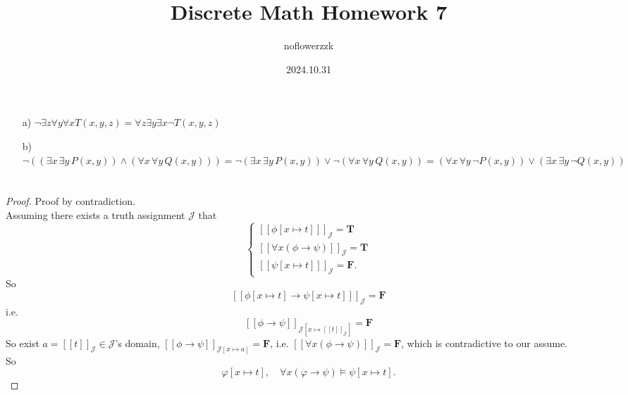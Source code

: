 \documentclass{article}
\title{Discrete Math Homework 7}
\author{noflowerzzk}
\date{2024.10.31}
\begin{document}
\maketitle

\section{}
\begin{itemize}
    \item [a)] $ \lnot \exists z \forall y \forall x T(x, y, z) = \forall z \exists y \exists x \lnot T(x, y , z)$
    \item [b)] $\neg \left( (\exists x \, \exists y \, P(x, y)) \land (\forall x \, \forall y \, Q(x, y)) \right)
     = \neg (\exists x \, \exists y \, P(x, y)) \lor \neg (\forall x \, \forall y \, Q(x, y))
     = (\forall x \, \forall y \, \neg P(x, y)) \lor (\exists x \, \exists y \, \neg Q(x, y))$
\end{itemize}

\section{}

\begin{proof}
    Proof by contradiction. \\
    Assuming there exists a truth assignment $\mathcal{J}$ that 
    $$
    \begin{cases}
        [\![\phi [x \mapsto t]]\!]_\mathcal{J} = \mathbf{T} \\
        [\![\forall x (\phi \rightarrow \psi )]\!]_\mathcal{J} = \mathbf{T} \\
        [\![\psi[x \mapsto t]]\!]_\mathcal{J} = \mathbf{F}.
    \end{cases}
    $$
    So $$[\![\phi [x \mapsto t] \rightarrow \psi [x \mapsto t]]\!]_\mathcal{J} = \mathbf{F}$$i.e. 
    $$[\![\phi \rightarrow \psi]\!]_{\mathcal{J}[x \mapsto [\![t]\!]_\mathcal{J}]} = \mathbf{F}$$
    So exist $a = [\![t]\!]_\mathcal{J} \in \mathcal{J}$'s domain, $[\![\phi \rightarrow \psi]\!]_{\mathcal{J}[x \mapsto a]} = \mathbf{F}$, i.e. $[\![\forall x (\phi \rightarrow \psi )]\!]_\mathcal{J} = \mathbf{F}$, which is contradictive to our assume. \\
    So \[
        \varphi[x \mapsto t], \quad \forall x (\varphi \rightarrow \psi) \models \psi[x \mapsto t].
    \]

\end{proof}
\end{document}
